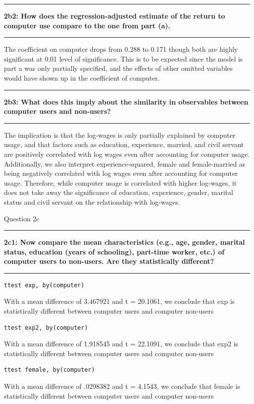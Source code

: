 \documentclass[12pt]{article}
\newcommand\question[2]{\vspace{1em}\hrule\vspace{1em}\textbf{#1: #2}\vspace{1em}\hrule\vspace{1em}}
\begin{document}
\question{2b2}{How does the regression-adjusted estimate of the return to computer use compare to the one from part (a).  }
The coefficient on computer drops from 0.288 to 0.171 though both are highly significant at 0.01 level of significance. This is to be expected since the model is part a was only partially specified, and the effects of other omitted variables would have shown up in the coefficient of computer.

\question{2b3}{What does this imply about the similarity in observables between computer users and non-users? }
The implication is that the log-wages is only partially explained by computer usage, and that factors such as education, experience, married, and civil servant are positively correlated with log wages even after accounting for computer usage. Additionally, we also interpret experience-squared, female and female-married as being negatively correlated with log wages even after accounting for computer usage. Therefore, while computer usage is correlated with higher log-wages, it does not take away the significance of education, experience, gender, marital status and civil servant on the relationship with log-wages.

\begin{center}\LARGE{Question 2c}\end{center}

\question{2c1}{Now compare the mean characteristics (e.g., age, gender, marital status, education (years of schooling), part-time worker, etc.) of computer users to non-users.  Are they statistically different?  }
\begin{lstlisting}
ttest exp, by(computer)
\end{lstlisting}
With a mean difference of 3.467921 and t = 20.1061, we conclude that exp is statistically different between computer users and computer non-users

\begin{lstlisting}
ttest exp2, by(computer)
\end{lstlisting}
With a mean difference of 1.918545 and t = 22.1091, we conclude that exp2 is statistically different between computer users and computer non-users

\begin{lstlisting}
ttest female, by(computer)
\end{lstlisting}
With a mean difference of  .0298382 and t =  4.1543, we conclude that female is statistically different between computer users and computer non-users
\end{document}
